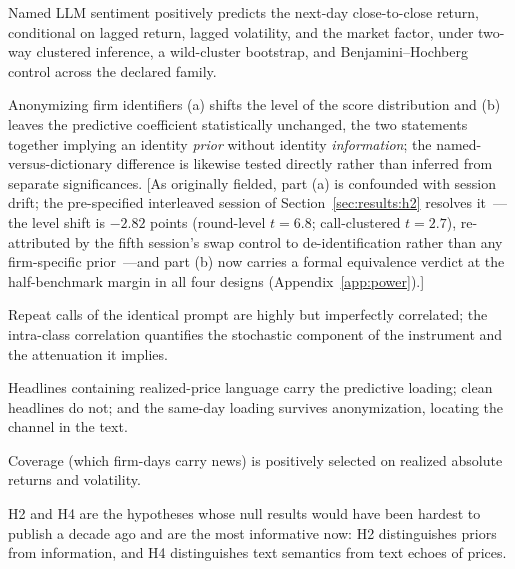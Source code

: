 \begin{description}[leftmargin=1.6em, itemsep=3pt]
\item[H1 (Baseline).] Named LLM sentiment positively predicts the next-day close-to-close return, conditional on lagged return, lagged volatility, and the market factor, under two-way clustered inference, a wild-cluster bootstrap, and Benjamini--Hochberg control across the declared family.
\item[H2 (Identity).] Anonymizing firm identifiers (a) shifts the level of the score distribution and (b) leaves the predictive coefficient statistically unchanged, the two statements together implying an identity \emph{prior} without identity \emph{information}; the named-versus-dictionary difference is likewise tested directly rather than inferred from separate significances. [As originally fielded, part (a) is confounded with session drift; the pre-specified interleaved session of Section~\ref{sec:results:h2} resolves it~---the level shift is $-2.82$ points (round-level $t=6.8$; call-clustered $t=2.7$), re-attributed by the fifth session's swap control to de-identification rather than any firm-specific prior~---and part (b) now carries a formal equivalence verdict at the half-benchmark margin in all four designs (Appendix~\ref{app:power}).]
\item[H3 (Stability).] Repeat calls of the identical prompt are highly but imperfectly correlated; the intra-class correlation quantifies the stochastic component of the instrument and the attenuation it implies.
\item[H4 (Echo).] Headlines containing realized-price language carry the predictive loading; clean headlines do not; and the same-day loading survives anonymization, locating the channel in the text.
\item[H5 (Selection).] Coverage (which firm-days carry news) is positively selected on realized absolute returns and volatility.
\end{description}

H2 and H4 are the hypotheses whose null results would have been hardest to publish a decade ago and are the most informative now: H2 distinguishes priors from information, and H4 distinguishes text semantics from text echoes of prices.
